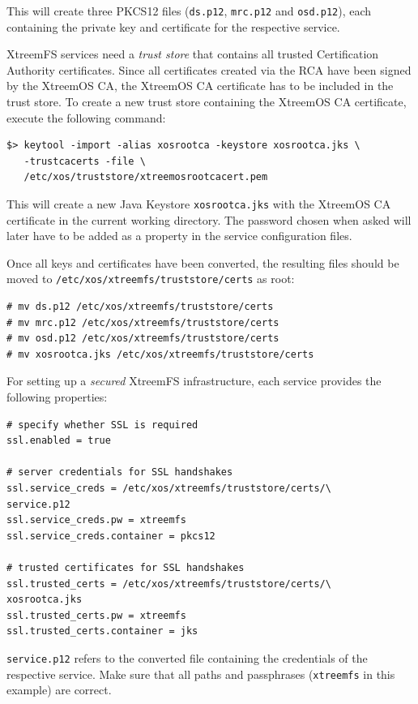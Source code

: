 \documentclass[a4paper,10pt]{book}
\begin{document}
This will create three PKCS12 files (\texttt{ds.p12}, \texttt{mrc.p12} and \texttt{osd.p12}), each containing the private key and certificate for the respective service.

XtreemFS services need a \textit{trust store} that contains all trusted Certification Authority certificates. Since all certificates created via the RCA have been signed by the XtreemOS CA, the XtreemOS CA certificate has to be included in the trust store. To create a new trust store containing the XtreemOS CA certificate, execute the following command:


\begin{verbatim}
$> keytool -import -alias xosrootca -keystore xosrootca.jks \
   -trustcacerts -file \
   /etc/xos/truststore/xtreemosrootcacert.pem
\end{verbatim}

This will create a new Java Keystore \texttt{xosrootca.jks} with the XtreemOS CA certificate in the current working directory. The password chosen when asked will later have to be added as a property in the service configuration files.

Once all keys and certificates have been converted, the resulting files should be moved to \texttt{/etc/xos/xtreemfs/truststore/certs} as root:


\begin{verbatim}
# mv ds.p12 /etc/xos/xtreemfs/truststore/certs
# mv mrc.p12 /etc/xos/xtreemfs/truststore/certs
# mv osd.p12 /etc/xos/xtreemfs/truststore/certs
# mv xosrootca.jks /etc/xos/xtreemfs/truststore/certs
\end{verbatim}


For setting up a \textit{secured} XtreemFS infrastructure, each service provides the following properties:


\begin{verbatim}
# specify whether SSL is required
ssl.enabled = true

# server credentials for SSL handshakes
ssl.service_creds = /etc/xos/xtreemfs/truststore/certs/\
service.p12
ssl.service_creds.pw = xtreemfs
ssl.service_creds.container = pkcs12

# trusted certificates for SSL handshakes
ssl.trusted_certs = /etc/xos/xtreemfs/truststore/certs/\
xosrootca.jks
ssl.trusted_certs.pw = xtreemfs
ssl.trusted_certs.container = jks
\end{verbatim}

\texttt{service.p12} refers to the converted file containing the credentials of the respective service. Make sure that all paths and passphrases (\texttt{xtreemfs} in this example) are correct.
\end{document}
